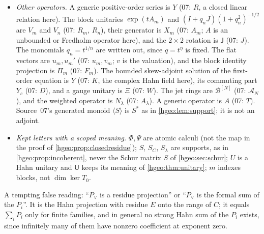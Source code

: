\documentclass[11pt,letterpaper]{article}
\numberwithin{equation}{section}
\theoremstyle{definition}
\theoremstyle{remark}
\newcommand{\diag}{\operatorname{diag}}
\newcommand{\Un}{\mathsf U}
\newcommand{\abs}[1]{\lvert #1\rvert}
\newcommand{\Dg}{\mathscr D}
\begin{document}
\begin{itemize}
the block map of the proof of \cref{hgeo:thm:adjoint}. The diagonal
compression is $\Dg_E$ (07: $\mathcal D_E$; $\mathcal D$ is the block matrix
of \cref{hgeo:sec:schur}). Source~07's $G=C^*C+F$ is $\Omega=C^*C+E^\perp$,
because $G$ is a Hilbert space here. Its range projection $Q=CG^{-1}C^*$ is
$P_\vee$: the $Q$'s of the report are residue projections, and $P_\vee$ is
indeed the join of the family (\cref{hgeo:us:rem:joins}). Its $T=C+(I-Q)F$ is
$W$: $T$ is $\diag(1/n)$ here, and in the finite case this $W$ is exactly the
$W$ of \cref{hgeo:thm:finite} (\cref{hgeo:us:rem:finite}). Its
$B=(T^*T)^{-1/2}$ is $\abs{W}^{-1}=(W^*W)^{-1/2}$, the formal binomial series
of \eqref{hgeo:eq:formalcalculus}, not an ordinary operator absolute value;
$B$ is the row operator \eqref{hgeo:eq:rowB}.
\item \emph{Other operators.} A generic positive-order series is $Y$ (07:
$R$, a closed linear relation here). The block unitaries $\exp(tA_m)$ and
$(I+q_nJ)(1+q_n^2)^{-1/2}$ are $V_m$ and $V_n$ (07: $R_m$, $R_n$), their
generator is $X_m$ (07: $A_m$; $A$ is an unbounded or Fredholm operator
here), and the $2\times2$ rotation is $\mathsf J$ (07: $J$). The monomials
$q_n=t^{1/n}$ are written out, since $q=t^\eta$ is fixed. The flat vectors
are $u_m,u_m'$ (07: $u_m,v_m$; $v$ is the valuation), and the block identity
projection is $\Pi_m$ (07: $F_m$). The bounded skew-adjoint solution of the
first-order equation is $Y$ (07: $K$, the complex Hahn field here), its
commuting part $Y_c$ (07: $D$), and a gauge unitary is $\Xi$ (07: $W$). The
jet rings are $\mathscr B^{[N]}$ (07: $\mathscr A_N$), and the weighted
operator is $N_\lambda$ (07: $A_\lambda$). A generic operator is $A$ (07:
$T$). Source~07's generated monoid $\langle S\rangle$ is $S^*$ as in
\cref{hgeo:lem:support}; it is not an adjoint.
\item \emph{Kept letters with a scoped meaning.} $\Phi,\Psi$ are atomic
calculi (not the map in the proof of \cref{hgeo:prop:closedresidue}); $S$,
$S_C$, $S_\lambda$ are supports, as in \cref{hgeo:prop:incoherent}, never the
Schur matrix $S$ of \cref{hgeo:sec:schur}; $U$ is a Hahn unitary and
$\Un$ keeps its meaning of \cref{hgeo:thm:unitary}; $m$ indexes blocks, not
$\dim\ker T_0$.
\end{itemize}
A tempting false reading: ``$P_\vee$ is a residue projection'' or ``$P_\vee$
is the formal sum of the $P_i$''. It is the Hahn projection with residue $E$
onto the range of $C$; it equals $\sum_iP_i$ only for finite families, and in
general no strong Hahn sum of the $P_i$ exists, since infinitely many of them
have nonzero coefficient at exponent zero.
\end{document}
